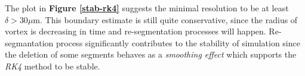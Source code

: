The plot in \textbf{Figure \ref{stab-rk4}} suggests the minimal resolution to be at least $\delta >30\mu\text{m}$. This boundary estimate is still quite conservative, since the radius of vortex is decreasing in time and re-segmentation processes will happen.
Re-segmantation process significantly contributes to the stability of simulation since the deletion of some segments behaves as a \textit{smoothing effect} which supports the \textit{RK4} method to be stable.

\newpage
